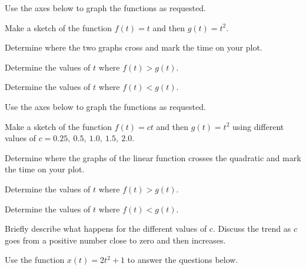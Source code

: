 \begin{problem}
\item Use the axes below to graph the functions as requested.

  \scalebox{0.7}{}

  \begin{subproblem}
  \item Make a sketch of the function $f(t)=t$ and then $g(t)=t^2$.
  \item Determine where the two graphs cross and mark the time on your
    plot.
  \item Determine the values of $t$ where $f(t)>g(t)$. 
    \vfill
  \item Determine the values of $t$ where $f(t)<g(t)$.
    \vfill
  \end{subproblem}

  \clearpage

\item Use the axes below to graph the functions as requested.

  \scalebox{0.7}{}

  \begin{subproblem}
  \item Make a sketch of the function $f(t)=c t$ and then $g(t)=t^2$
    using different values of $c=0.25,~0.5,~1.0,~1.5,~2.0$.
  \item Determine where the graphs of the linear function crosses the
    quadratic and mark the time on your plot.
  \item Determine the values of $t$ where $f(t)>g(t)$. 
    \vfill
  \item Determine the values of $t$ where $f(t)<g(t)$.
    \vfill
  \item Briefly describe what happens for the different values of
    $c$. Discuss the trend as $c$ goes from a positive number close to
    zero and then increases.
    \vfill
  \end{subproblem}

  \clearpage

\item Use the function $x(t)=2t^2+1$ to answer the questions below.


\end{problem}
